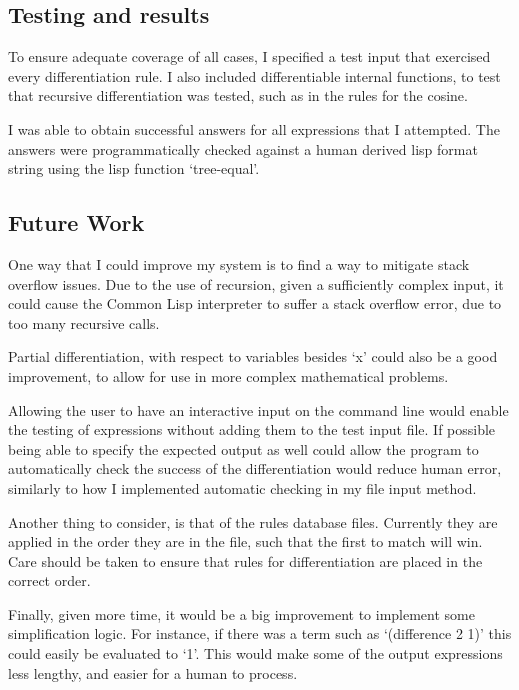 \documentclass[letterpaper]{article}
\begin{document}
\subsection{Testing and results}
To ensure adequate coverage of all cases, I specified a test input that exercised
every differentiation rule. I also included differentiable internal functions,
to test that recursive differentiation was tested, such as in the rules for the cosine.

I was able to obtain successful answers for all expressions that I attempted. The
answers were programmatically checked against a human derived lisp format string
using the lisp function `tree-equal'.

\subsection{Future Work}
One way that I could improve my system is to find a way to mitigate stack overflow issues.
Due to the use of recursion, given a sufficiently complex input, it could cause the
Common Lisp interpreter to suffer a stack overflow error, due to too many recursive calls.

Partial differentiation, with respect to variables besides `x' could also be a good improvement,
to allow for use in more complex mathematical problems.

Allowing the user to have an interactive input on the command line would enable the testing of
expressions without adding them to the test input file. If possible being able to 
specify the expected output as well could allow the program to automatically check
the success of the differentiation would reduce human error, similarly to how I implemented
automatic checking in my file input method.

Another thing to consider, is that of the rules database files. Currently they are applied
in the order they are in the file, such that the first to match will win. Care should be 
taken to ensure that rules for differentiation are placed in the correct order.

Finally, given more time, it would be a big improvement to implement some simplification logic.
For instance, if there was a term such as `(difference 2 1)' this could easily be
evaluated to `1'. This would make some of the output expressions less lengthy, and 
easier for a human to process.

\onecolumn

\newpage
\end{document}
